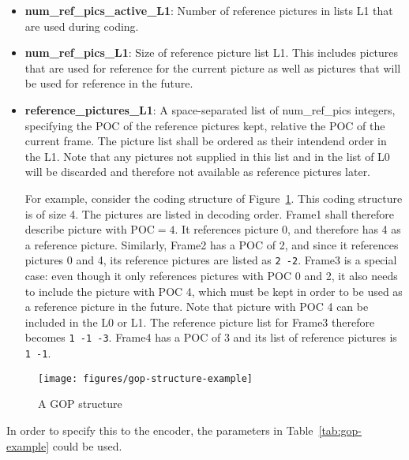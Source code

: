 \documentclass[a4paper,11pt]{jvetdoc}
\begin{document}
\begin{itemize}
\item[]\textbf{num_ref_pics_active_L1}: Number of reference pictures in lists L1
that are used during coding.

\item[]\textbf{num_ref_pics_L1}: Size of reference picture list L1.
This includes pictures that are used for reference for the
current picture as well as pictures that will be used for reference in
the future.

\item[]\textbf{reference_pictures_L1}: A space-separated list of
num_ref_pics integers, specifying the POC of the reference pictures
kept, relative the POC of the current frame. The picture list shall be
ordered as their intendend order in the L1.
Note that any pictures not supplied in this list and in the list of L0 will be discarded and
therefore not available as reference pictures later.

For example, consider the coding structure of Figure~\ref{fig:gop-example}.
This coding structure is of size 4. The pictures are listed in decoding
order. Frame1 shall therefore describe picture with $\textrm{POC}=4$. It
references picture 0, and therefore has 4 as a reference picture.
Similarly, Frame2 has a POC of 2, and since it references pictures 0 and
4, its reference pictures are listed as \verb|2 -2|. Frame3 is a special
case: even though it only references pictures with POC 0 and 2, it also
needs to include the picture with POC 4, which must be kept in order to
be used as a reference picture in the future. Note that picture with POC 4 can be
included in the L0 or L1. The reference picture list for Frame3 therefore becomes \verb|1 -1 -3|. 
Frame4 has a POC of 3 and its list of reference pictures is \verb|1 -1|.
\end{itemize}

\begin{figure}[h]
\caption{A GOP structure}
\label{fig:gop-example}
\centering
\texttt{[image: figures/gop-structure-example]}
\end{figure}

In order to specify this to the encoder, the parameters in
Table~\ref{tab:gop-example} could be used.
\end{document}

